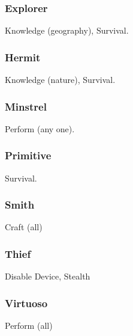 \subsubsection{Explorer}
 Knowledge (geography), Survival.

\subsubsection{Hermit}
 Knowledge (nature), Survival.

\subsubsection{Minstrel}
 Perform (any one).

\subsubsection{Primitive}
 Survival.

\subsubsection{Smith}
 Craft (all)

\subsubsection{Thief}
 Disable Device, Stealth

\subsubsection{Virtuoso}
 Perform (all)
